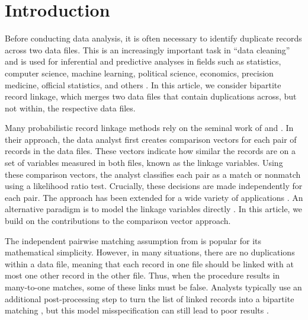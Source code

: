 \documentclass[ba]{imsart}
\begin{document}


\section{Introduction}
\label{sec:introduction}

Before conducting data analysis, it is often necessary to identify duplicate records across two data files. This is an increasingly important task in ``data cleaning'' and is used for inferential and predictive analyses in fields such as statistics, computer science, machine learning, political science, economics, precision medicine, official statistics, and others \citep[e.g.,][]{christen_2012, gutman2013bayesian, DalzellReiter18, tang2020}. In this article, we consider bipartite record linkage, which merges two data files that contain duplications across, but not within, the respective data files. 

Many probabilistic record linkage methods rely on the seminal work of \cite{fellegi_theory_1969} and \cite{newcombe_automatic_1959}. In their approach, the data analyst first creates comparison vectors for each pair of records in the data files. These vectors indicate how similar the records are on a set of variables measured in both files, known as the linkage variables.  Using these comparison vectors, the analyst classifies each pair as a match or nonmatch using a likelihood ratio test. Crucially, these decisions are made independently for each pair. The \cite{fellegi_theory_1969} approach has been extended for a wide variety of applications \citep[e.g.,][]{Winkler1990, fair2004generalized, wagner2014person, gill2003english, enamorado2019using, aleshinguendel2021multifile}. An alternative paradigm is to model the linkage variables directly \citep[e.g.,][]{tancredi2011hierarchical, steorts_bayesian_2016, marchant_distributed_2019, betancourt2022prior}. In this article, we build on the contributions to the comparison vector approach. 

\newpage
The independent pairwise matching assumption from \cite{fellegi_theory_1969} is popular for its mathematical simplicity. However, in many situations, there are no duplications within a data file, meaning that each record in one file should be linked with at most one other record in the other file. Thus, when the procedure results in many-to-one matches, some of these links must be false. Analysts typically use an additional post-processing step to turn the list of linked records into a bipartite matching \citep{jaro1989}, but this model misspecification can still lead to poor results \citep{sadinle_bayesian_2017}.
\end{document}
